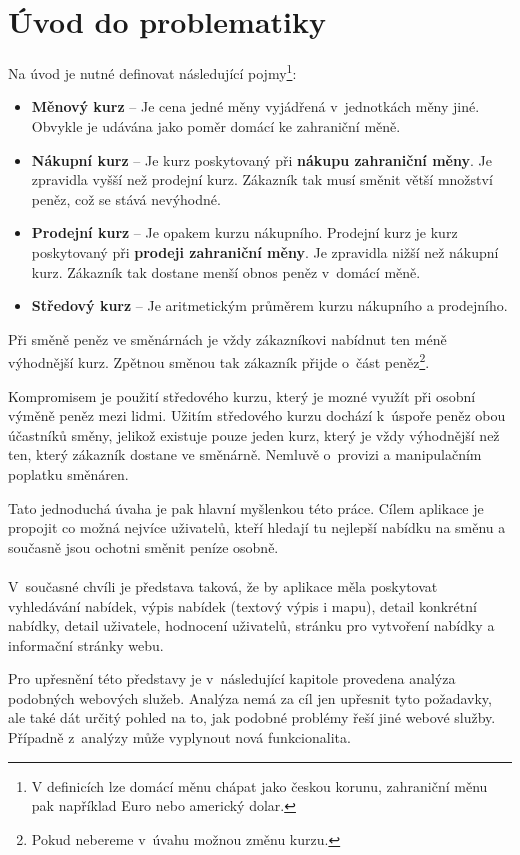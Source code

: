 \chapter{Úvod do problematiky}
\label{problematics}

Na úvod je nutné definovat následující pojmy\footnote{V definicích lze domácí měnu chápat jako českou korunu, zahraniční měnu pak například Euro nebo americký dolar.}:
\begin{itemize}
    \item \textbf{Měnový kurz} -- Je cena jedné měny vyjádřená v~jednotkách měny jiné. Obvykle je udávána jako poměr domácí ke zahraniční měně.
    \item \textbf{Nákupní kurz} -- Je kurz poskytovaný při \textbf{nákupu zahraniční měny}. Je zpravidla vyšší než prodejní kurz. Zákazník tak musí směnit větší množství peněz, což se stává nevýhodné.
    \item \textbf{Prodejní kurz} -- Je opakem kurzu nákupního. Prodejní kurz je kurz poskytovaný při \textbf{prodeji zahraniční měny}. Je zpravidla nižší než nákupní kurz. Zákazník tak dostane menší obnos peněz v~domácí měně.
    \item \textbf{Středový kurz} -- Je aritmetickým průměrem kurzu nákupního a prodejního.
\end{itemize}

Při směně peněz ve směnárnách je vždy zákazníkovi nabídnut ten méně výhodnější kurz. Zpětnou směnou tak zákazník přijde o~část peněz\footnote{Pokud nebereme v~úvahu možnou změnu kurzu.}.

Kompromisem je použití středového kurzu, který je mozné využít při osobní výměně peněz mezi lidmi. Užitím středového kurzu dochází k~úspoře peněz obou účastníků směny, jelikož existuje pouze jeden kurz, který je vždy výhodnější než ten, který zákazník dostane ve směnárně. Nemluvě o~provizi a manipulačním poplatku směnáren.

Tato jednoduchá úvaha je pak hlavní myšlenkou této práce. Cílem aplikace je propojit co možná nejvíce uživatelů, kteří hledají tu nejlepší nabídku na směnu a současně jsou ochotni směnit peníze osobně.
\\\\
V~současné chvíli je představa taková, že by aplikace měla poskytovat vyhledávání nabídek, výpis nabídek (textový výpis i mapu), detail konkrétní nabídky, detail uživatele, hodnocení uživatelů, stránku pro vytvoření nabídky a informační stránky webu.

Pro upřesnění této představy je v~následující kapitole provedena analýza podobných webových služeb. Analýza nemá za cíl jen upřesnit tyto požadavky, ale také dát určitý pohled na to, jak podobné problémy řeší jiné webové služby. Případně z~analýzy může vyplynout nová funkcionalita.